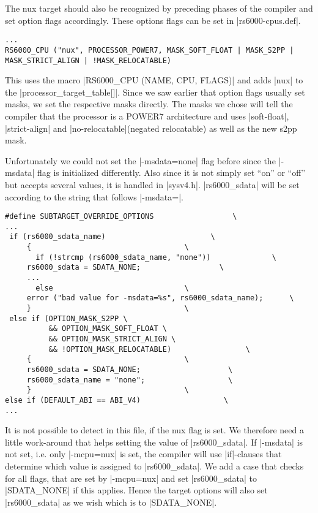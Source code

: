 The nux target should also be recognized by preceding phases of the compiler and set option flags accordingly.
These options flags can be set in |rs6000-cpus.def|.

\begin{lstlisting}
...
RS6000_CPU ("nux", PROCESSOR_POWER7, MASK_SOFT_FLOAT | MASK_S2PP | MASK_STRICT_ALIGN | !MASK_RELOCATABLE)
\end{lstlisting}

This uses the macro |RS6000_CPU (NAME, CPU, FLAGS)| and adds |nux| to the |processor_target_table[]|.
Since we saw earlier that option flags usually set masks, we set the respective masks directly.
The masks we chose will tell the compiler that the processor is a POWER7 architecture and uses |soft-float|, |strict-align| and |no-relocatable|(negated relocatable) as well as the new s2pp mask.

Unfortunately we could not set the |-msdata=none| flag before since the |-msdata| flag is initialized differently.
Also since it is not simply set ``on'' or ``off'' but accepts several values, it is handled in |sysv4.h|.
|rs6000_sdata| will be set according to the string that follows |-msdata=|.
\begin{lstlisting}
#define SUBTARGET_OVERRIDE_OPTIONS                  \
...
 if (rs6000_sdata_name)                        \
     {                                   \
       if (!strcmp (rs6000_sdata_name, "none"))              \
     rs6000_sdata = SDATA_NONE;                  \
     ...
       else                              \
     error ("bad value for -msdata=%s", rs6000_sdata_name);      \
     }                                   \
 else if (OPTION_MASK_S2PP \
          && OPTION_MASK_SOFT_FLOAT \
          && OPTION_MASK_STRICT_ALIGN \
          && !OPTION_MASK_RELOCATABLE)                 \
     {                                   \
     rs6000_sdata = SDATA_NONE;                    \
     rs6000_sdata_name = "none";                   \
     }                                   \
else if (DEFAULT_ABI == ABI_V4)                   \
...
\end{lstlisting}

It is not possible to detect in this file, if the nux flag is set.
We therefore need a little work-around that helps setting the value of |rs6000_sdata|.
If |-msdata| is not set, i.e. only |-mcpu=nux| is set, the compiler will use |if|-clauses that determine which value is assigned to |rs6000_sdata|.
We add a case that checks for all flags, that are set by |-mcpu=nux| and set |rs6000_sdata| to |SDATA_NONE| if this applies.
Hence the target options will also set |rs6000_sdata| as we wish which is to |SDATA_NONE|.

